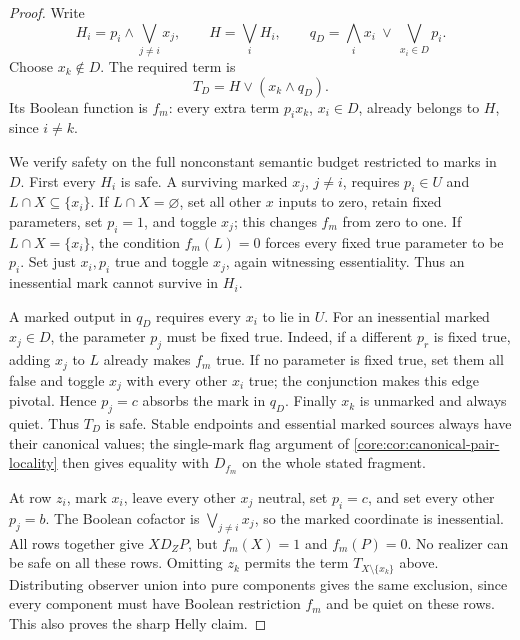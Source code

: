 \begin{proof}
Write
\[
 H_i=p_i\wedge\bigvee_{j\ne i}x_j,\qquad H=\bigvee_iH_i,\qquad
 q_D=\bigwedge_i x_i\ \vee\ \bigvee_{x_i\in D}p_i.
\]
Choose $x_k\notin D$. The required term is
\[
 T_D=H\vee(x_k\wedge q_D).
\]
Its Boolean function is $f_m$: every extra term $p_ix_k$, $x_i\in D$,
already belongs to $H$, since $i\ne k$.

We verify safety on the full nonconstant semantic budget restricted to
marks in $D$. First every $H_i$ is safe. A surviving marked $x_j$,
$j\ne i$, requires $p_i\in U$ and $L\cap X\subseteq\{x_i\}$.
If $L\cap X=\varnothing$, set all other $x$ inputs to zero, retain fixed
parameters, set $p_i=1$, and toggle $x_j$; this changes $f_m$ from zero
to one. If $L\cap X=\{x_i\}$, the condition $f_m(L)=0$ forces every
fixed true parameter to be $p_i$. Set just $x_i,p_i$ true and toggle
$x_j$, again witnessing essentiality. Thus an inessential mark cannot
survive in $H_i$.

A marked output in $q_D$ requires every $x_i$ to lie in $U$.
For an inessential marked $x_j\in D$, the parameter $p_j$ must be fixed
true. Indeed, if a different $p_r$ is fixed true, adding $x_j$ to $L$
already makes $f_m$ true. If no parameter is fixed true, set them all
false and toggle $x_j$ with every other $x_i$ true; the conjunction makes
this edge pivotal. Hence $p_j=c$ absorbs the mark in $q_D$.
Finally $x_k$ is unmarked and always quiet. Thus $T_D$ is safe.
Stable endpoints and essential marked sources always have their canonical
values; the single-mark flag argument of
\cref{core:cor:canonical-pair-locality} then gives equality with $D_{f_m}$
on the whole stated fragment.

At row $z_i$, mark $x_i$, leave every other $x_j$ neutral, set $p_i=c$,
and set every other $p_j=b$. The Boolean cofactor is
$\bigvee_{j\ne i}x_j$, so the marked coordinate is inessential.
All rows together give $XD_ZP$, but $f_m(X)=1$ and $f_m(P)=0$.
No realizer can be safe on all these rows. Omitting $z_k$ permits the
term $T_{X\setminus\{x_k\}}$ above. Distributing observer union into
pure components gives the same exclusion, since every component must
have Boolean restriction $f_m$ and be quiet on these rows. This also
proves the sharp Helly claim.
\end{proof}


